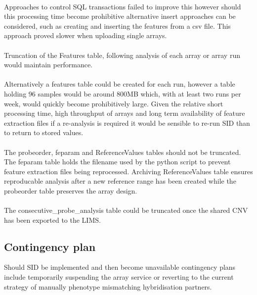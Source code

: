 \paragraph*{}
Approaches to control SQL transactions failed to improve this however should this processing time become prohibitive alternative insert approaches can be considered, such as creating and inserting the features from a \ac{csv} file. This approach proved slower when uploading single arrays.
\paragraph*{}
Truncation of the Features table, following analysis of each array or array run would maintain performance.
\paragraph*{}
Alternatively a features table could be created for each run, however a table holding 96 samples would be around 800MB which, with at least two runs per week, would quickly become prohibitively large. Given the relative short processing time, high throughput of arrays and long term availability of feature extraction files if a re-analysis is required it would be sensible to re-run SID than to return to stored values.
\paragraph*{}
The probeorder, feparam and ReferenceValues tables should not be truncated. The feparam table holds the filename used by the python script to prevent feature extraction files being reprocessed. Archiving ReferenceValues table ensures reproducable analysis after a new reference range has been created while the probeorder table preserves the array design.
\paragraph*{}
The consecutive\_probe\_analysis table could be truncated once the shared CNV has been exported to the LIMS.

\subsection{Contingency plan}
Should SID be implemented and then become unavailable contingency plans include temporarily suspending the array service or reverting to the current strategy of manually phenotype mismatching hybridisation partners.

